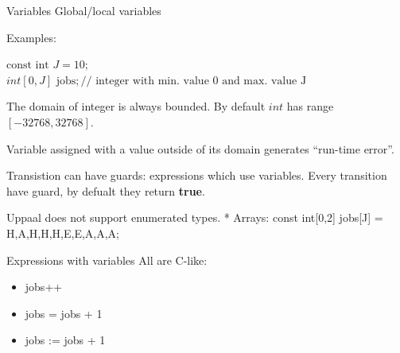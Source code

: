 \documentclass{beamer}
\begin{document}
\begin{frame}{Variables}
	Global/local variables\newline
	
	Examples:\newline
	
	$\text{const int } J = 10;$\\
	$ int[0,J] \text{ jobs}; // \text{ integer with min. value 0 and max. value J}$\newline
	
	The domain of integer is always bounded. By default $int$ has range $[-32768, 32768]$.\newline
	
	Variable assigned with a value outside of its domain generates ``run-time error''.\newline
	
	Transistion can have guards: expressions which use variables. Every transition have guard, by defualt they return \textbf{true}.\newline
	
	Uppaal does not support enumerated types.\newline
	*
	Arrays: const int[0,2] jobs[J] = {H,A,H,H,H,E,E,A,A,A};
\end{frame}

\begin{frame}{Expressions with variables}
	All are C-like:
	\begin{itemize}
		\item jobs++
		\item jobs = jobs + 1
		\item jobs := jobs + 1
	\end{itemize}
	
\end{frame}
\end{document}
